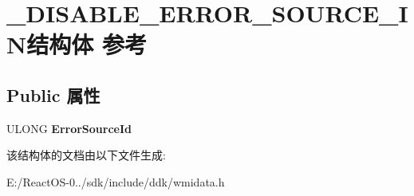 \hypertarget{struct___d_i_s_a_b_l_e___e_r_r_o_r___s_o_u_r_c_e___i_n}{}\section{\+\_\+\+D\+I\+S\+A\+B\+L\+E\+\_\+\+E\+R\+R\+O\+R\+\_\+\+S\+O\+U\+R\+C\+E\+\_\+\+I\+N结构体 参考}
\label{struct___d_i_s_a_b_l_e___e_r_r_o_r___s_o_u_r_c_e___i_n}
\subsection*{Public 属性}
\begin{DoxyCompactItemize}
\item 
\mbox{\label{struct___d_i_s_a_b_l_e___e_r_r_o_r___s_o_u_r_c_e___i_n_ab6d17583e453b4cff67bb4a69cf42331}} 
U\+L\+O\+NG {\bfseries Error\+Source\+Id}
\end{DoxyCompactItemize}


该结构体的文档由以下文件生成\+:\begin{DoxyCompactItemize}
\item 
E\+:/\+React\+O\+S-\/0../sdk/include/ddk/wmidata.\+h\end{DoxyCompactItemize}
